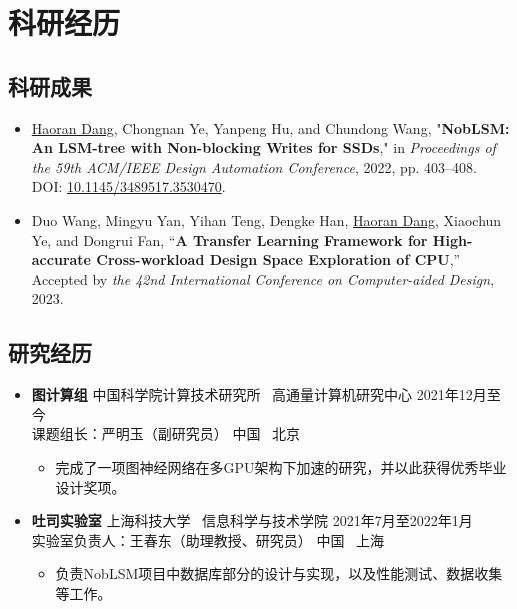 \documentclass[a4paper,10pt]{ctexart} %
\begin{document}
\section{科研经历}

    \subsection{科研成果}

        \begin{itemize}
            \item \underline{Haoran Dang}, Chongnan Ye, Yanpeng Hu, and Chundong Wang, "\textbf{NobLSM: An LSM-tree with Non-blocking Writes for SSDs}," in \textit{Proceedings of the 59th ACM/IEEE Design Automation Conference}, 2022, pp. 403–408. DOI: \href{https://doi.org/10.1145/3489517.3530470}{10.1145/3489517.3530470}.
            \item Duo Wang, Mingyu Yan, Yihan Teng, Dengke Han, \underline{Haoran Dang}, Xiaochun Ye, and Dongrui Fan, “\textbf{A Transfer Learning Framework for High-accurate Cross-workload Design Space Exploration of CPU},” Accepted by \textit{the 42nd International Conference on Computer-aided Design}, 2023.
        \end{itemize}

    \subsection{研究经历}

    \begin{itemize}
        \item \textbf{图计算组} \quad 中国科学院计算技术研究所 \, 高通量计算机研究中心 \hfill 2021年12月至今 \\
        {\small 课题组长：严明玉（副研究员）} \hfill 中国 \, 北京
        \begin{small}
            \begin{itemize}
                \item 完成了一项图神经网络在多GPU架构下加速的研究，并以此获得优秀毕业设计奖项。
            \end{itemize}
        \end{small}
    \end{itemize}

    \begin{itemize}
        \item \textbf{吐司实验室} \quad 上海科技大学 \, 信息科学与技术学院 \hfill 2021年7月至2022年1月 \\
        {\small 实验室负责人：王春东（助理教授、研究员）} \hfill 中国 \, 上海
        \begin{small}
            \begin{itemize}
                \item 负责NobLSM项目中数据库部分的设计与实现，以及性能测试、数据收集等工作。
            \end{itemize}
        \end{small}
    \end{itemize}
\end{document}
